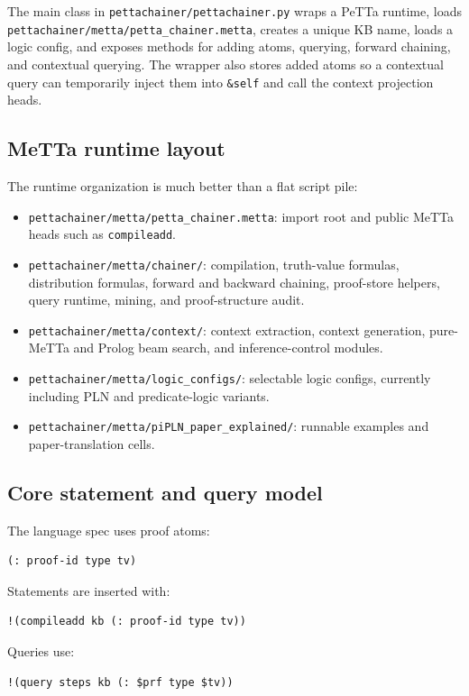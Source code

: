 \documentclass[11pt]{article}
\newcommand{\code}[1]{\texttt{#1}}
\newcommand{\fpath}[1]{\texttt{#1}}
\begin{document}
The main class in \fpath{pettachainer/pettachainer.py} wraps a PeTTa runtime,
loads \fpath{pettachainer/metta/petta\_chainer.metta}, creates a unique KB name,
loads a logic config, and exposes methods for adding atoms, querying, forward
chaining, and contextual querying.  The wrapper also stores added atoms so a
contextual query can temporarily inject them into \code{\&self} and call the
context projection heads.

\subsection{MeTTa runtime layout}

The runtime organization is much better than a flat script pile:
\begin{itemize}
  \item \fpath{pettachainer/metta/petta\_chainer.metta}: import root and public
  MeTTa heads such as \code{compileadd}.
  \item \fpath{pettachainer/metta/chainer/}: compilation, truth-value formulas,
  distribution formulas, forward and backward chaining, proof-store helpers,
  query runtime, mining, and proof-structure audit.
  \item \fpath{pettachainer/metta/context/}: context extraction, context
  generation, pure-MeTTa and Prolog beam search, and inference-control modules.
  \item \fpath{pettachainer/metta/logic\_configs/}: selectable logic configs,
  currently including PLN and predicate-logic variants.
  \item \fpath{pettachainer/metta/piPLN\_paper\_explained/}: runnable examples
  and paper-translation cells.
\end{itemize}

\subsection{Core statement and query model}

The language spec uses proof atoms:
\begin{verbatim}
(: proof-id type tv)
\end{verbatim}

Statements are inserted with:
\begin{verbatim}
!(compileadd kb (: proof-id type tv))
\end{verbatim}

Queries use:
\begin{verbatim}
!(query steps kb (: $prf type $tv))
\end{verbatim}
\end{document}
